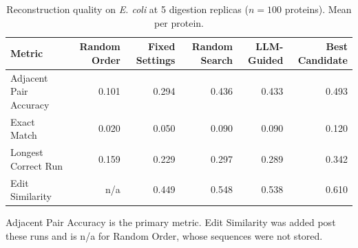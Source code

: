 \begin{table}[!tb]
  \centering
  \caption{Reconstruction quality on \textnormal{\textnormal{\textit{E. coli}}} at 5 digestion replicas ($n=100$ proteins). Mean per protein.}
  \label{tab:main_results_ecoli_r5}
  \begin{tabular}{lrrrrr}
    \toprule
    Metric & Random Order & Fixed Settings & Random Search & LLM-Guided & Best Candidate \\
    \midrule
    Adjacent Pair Accuracy & 0.101 & 0.294 & 0.436 & 0.433 & 0.493 \\
    Exact Match & 0.020 & 0.050 & 0.090 & 0.090 & 0.120 \\
    Longest Correct Run & 0.159 & 0.229 & 0.297 & 0.289 & 0.342 \\
    Edit Similarity & n/a & 0.449 & 0.548 & 0.538 & 0.610 \\
    \bottomrule
  \end{tabular}
  \par\smallskip\footnotesize{Adjacent Pair Accuracy is the primary metric. Edit Similarity was added post these runs and is n/a for Random Order, whose sequences were not stored.}
\end{table}
